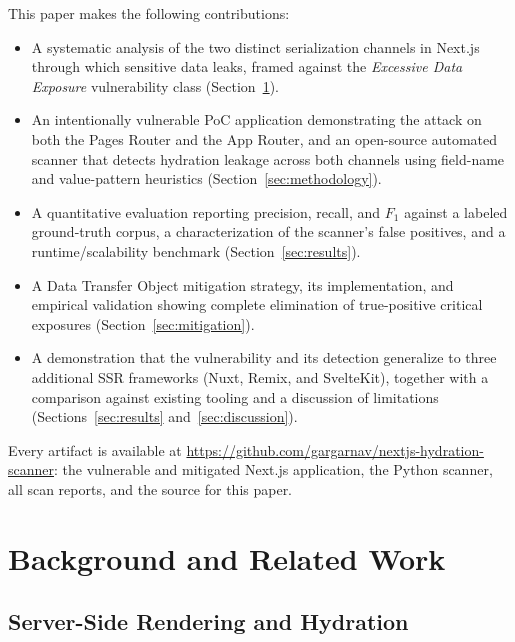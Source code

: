 \documentclass[runningheads]{llncs}
\begin{document}
This paper makes the following contributions:

\begin{itemize}
  \item A systematic analysis of the two distinct serialization channels
        in Next.js through which sensitive data leaks, framed against the
        \emph{Excessive Data Exposure} vulnerability class
        (Section~\ref{sec:background}).
  \item An intentionally vulnerable PoC application demonstrating the
        attack on both the Pages Router and the App Router, and an
        open-source automated scanner that detects hydration leakage
        across both channels using field-name and value-pattern
        heuristics (Section~\ref{sec:methodology}).
  \item A quantitative evaluation reporting precision, recall, and $F_1$
        against a labeled ground-truth corpus, a characterization of the
        scanner's false positives, and a runtime/scalability benchmark
        (Section~\ref{sec:results}).
  \item A Data Transfer Object mitigation strategy, its implementation,
        and empirical validation showing complete elimination of
        true-positive critical exposures (Section~\ref{sec:mitigation}).
  \item A demonstration that the vulnerability and its detection
        generalize to three additional SSR frameworks (Nuxt, Remix, and
        SvelteKit), together with a comparison against existing tooling
        and a discussion of limitations (Sections~\ref{sec:results}
        and~\ref{sec:discussion}).
\end{itemize}

Every artifact is available at
\url{https://github.com/gargarnav/nextjs-hydration-scanner}: the
vulnerable and mitigated Next.js application, the Python scanner, all
scan reports, and the source for this paper.

\section{Background and Related Work}
\label{sec:background}

\subsection{Server-Side Rendering and Hydration}
\end{document}
